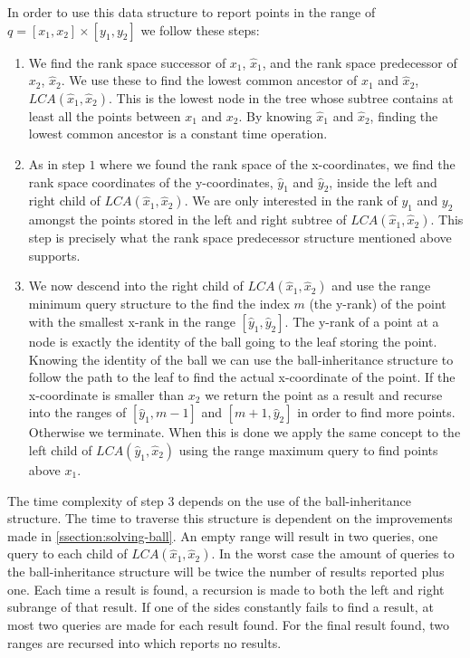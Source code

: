 In order to use this data structure to report points in the range of $q = [x_1, x_2] \times [y_1, y_2]$ we follow these steps:
\begin{enumerate}
  \item We find the rank space successor of $x_1$, $\hat{x}_1$, and the rank space predecessor of $x_2$, $\hat{x}_2$. We use these to find the lowest common ancestor of $\hat{x}_1$ and $\hat{x}_2$, $LCA(\hat{x}_1, \hat{x}_2)$. This is the lowest node in the tree whose subtree contains at least all the points between $x_1$ and $x_2$. By knowing $\hat{x}_1$ and $\hat{x}_2$, finding the lowest common ancestor is a constant time operation.   
  \item As in step $1$ where we found the rank space of the x-coordinates, we find the rank space coordinates of the y-coordinates, $\hat{y}_1$ and $\hat{y}_2$, inside the left and right child of $LCA(\hat{x}_1, \hat{x}_2)$. We are only interested in the rank of $y_1$ and $y_2$ amongst the points stored in the left and right subtree of $LCA(\hat{x}_1, \hat{x}_2)$. This step is precisely what the rank space predecessor structure mentioned above supports.
  \item We now descend into the right child of $LCA(\hat{x}_1, \hat{x}_2)$ and use the range minimum query structure to the find the index $m$ (the y-rank) of the point with the smallest x-rank in the range $[\hat{y}_1, \hat{y}_2]$. The y-rank of a point at a node is exactly the identity of the ball going to the leaf storing the point. Knowing the identity of the ball we can use the ball-inheritance structure to follow the path to the leaf to find the actual x-coordinate of the point. If the x-coordinate is smaller than $x_2$ we return the point as a result and recurse into the ranges of $[\hat{y}_1, m-1]$ and $[m+1, \hat{y}_2]$ in order to find more points. Otherwise we terminate. When this is done we apply the same concept to the left child of $LCA(\hat{y}_1, \hat{x}_2)$ using the range maximum query to find points above $x_1$.
\end{enumerate}


The time complexity of step $3$ depends on the use of the ball-inheritance structure. The time to traverse this structure is dependent on the improvements made in \ref{ssection:solving-ball}. An empty range will result in two queries, one query to each child of $LCA(\hat{x}_1, \hat{x}_2)$. In the worst case the amount of queries to the ball-inheritance structure will be twice the number of results reported plus one. Each time a result is found, a recursion is made to both the left and right subrange of that result. If one of the sides constantly fails to find a result, at most two queries are made for each result found. For the final result found, two ranges are recursed into which reports no results.

